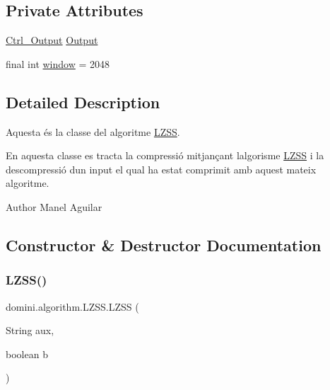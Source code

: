 \subsection*{Private Attributes}
\begin{DoxyCompactItemize}
\item 
\hyperlink{classpersistencia_1_1output_1_1Ctrl__Output}{Ctrl\+\_\+\+Output} \hyperlink{classdomini_1_1algorithm_1_1LZSS_ab15cbc33a0590c2ac42127ca16821fef}{Output}
\item 
final int \hyperlink{classdomini_1_1algorithm_1_1LZSS_a00d9f2e9bc2baa39513fad040b8e7123}{window} = 2048
\end{DoxyCompactItemize}


\subsection{Detailed Description}
Aquesta és la classe del algoritme \hyperlink{classdomini_1_1algorithm_1_1LZSS}{L\+Z\+SS}. 

En aquesta classe es tracta la compressió mitjançant l\textquotesingle{}algorisme \hyperlink{classdomini_1_1algorithm_1_1LZSS}{L\+Z\+SS} i la descompressió d\textquotesingle{}un input el qual ha estat comprimit amb aquest mateix algoritme.

\begin{DoxyAuthor}{Author}
Manel Aguilar 
\end{DoxyAuthor}


\subsection{Constructor \& Destructor Documentation}
\mbox{\label{classdomini_1_1algorithm_1_1LZSS_a991f29ccc89ecbb5645ea8f123205e20}} 
\subsubsection{\texorpdfstring{L\+Z\+S\+S()}{LZSS()}}
{\footnotesize\ttfamily domini.\+algorithm.\+L\+Z\+S\+S.\+L\+Z\+SS (\begin{DoxyParamCaption}\item[{String}]{aux,  }\item[{boolean}]{b }\end{DoxyParamCaption})\hspace{0.3cm}{\ttfamily [inline]}}



